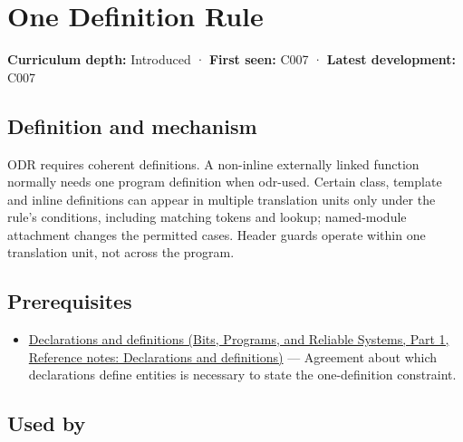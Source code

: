 \hypertarget{appendix-49d27bc9d9a5}{}\label{referencestart:appendix-49d27bc9d9a5}
\section{One Definition Rule}\label{appendix-49d27bc9d9a5-one-definition-rule}

\hypertarget{appendix-49d27bc9d9a5-one-definition-rule}{}

\textbf{Curriculum depth:} Introduced · \textbf{First seen:} C007 · \textbf{Latest development:} C007

\begin{allmightroledefinition}

\subsection{Definition and mechanism}\label{appendix-49d27bc9d9a5-definition-and-mechanism}

\hypertarget{appendix-49d27bc9d9a5-definition-and-mechanism}{}

ODR requires coherent definitions. A non-inline externally linked function normally needs one program definition when odr-used. Certain class, template and inline definitions can appear in multiple translation units only under the rule's conditions, including matching tokens and lookup; named-module attachment changes the permitted cases. Header guards operate within one translation unit, not across the program.

\end{allmightroledefinition}

\subsection{Prerequisites}\label{appendix-49d27bc9d9a5-prerequisites}

\hypertarget{appendix-49d27bc9d9a5-prerequisites}{}

\begin{itemize}
\tightlist
\item
  \href{../01-Bits-Programs-and-Reliable-Systems-P01/main.pdf\#appendix-2e4d494c2d94}{Declarations and definitions (Bits, Programs, and Reliable Systems, Part 1, Reference notes: Declarations and definitions)} --- Agreement about which declarations define entities is necessary to state the one-definition constraint.
\end{itemize}

\subsection{Used by}\label{appendix-49d27bc9d9a5-used-by}

